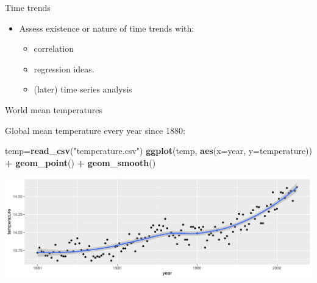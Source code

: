 \documentclass[
  ignorenonframetext,
]{beamer}
\newenvironment{Shaded}{\begin{snugshade}}{\end{snugshade}}
\newcommand{\DataTypeTok}[1]{\textcolor[rgb]{0.13,0.29,0.53}{#1}}
\newcommand{\KeywordTok}[1]{\textcolor[rgb]{0.13,0.29,0.53}{\textbf{#1}}}
\newcommand{\NormalTok}[1]{#1}
\newcommand{\OperatorTok}[1]{\textcolor[rgb]{0.81,0.36,0.00}{\textbf{#1}}}
\newcommand{\StringTok}[1]{\textcolor[rgb]{0.31,0.60,0.02}{#1}}
\providecommand{\tightlist}{%
  \setlength{\itemsep}{0pt}\setlength{\parskip}{0pt}}
\begin{document}
\begin{frame}{Time trends}
\protect\hypertarget{time-trends}{}

\begin{itemize}
\tightlist
\item
  Assess existence or nature of time trends with:

  \begin{itemize}
  \tightlist
  \item
    correlation
  \item
    regression ideas.
  \item
    (later) time series analysis
  \end{itemize}
\end{itemize}

\end{frame}

\begin{frame}[fragile]{World mean temperatures}
\protect\hypertarget{world-mean-temperatures}{}

Global mean temperature every year since 1880:

\small

\begin{Shaded}
\begin{Highlighting}[]
\NormalTok{temp=}\KeywordTok{read_csv}\NormalTok{(}\StringTok{"temperature.csv"}\NormalTok{)}
\KeywordTok{ggplot}\NormalTok{(temp, }\KeywordTok{aes}\NormalTok{(}\DataTypeTok{x=}\NormalTok{year, }\DataTypeTok{y=}\NormalTok{temperature)) }\OperatorTok{+}\StringTok{ }
\StringTok{  }\KeywordTok{geom_point}\NormalTok{() }\OperatorTok{+}\StringTok{ }\KeywordTok{geom_smooth}\NormalTok{()}
\end{Highlighting}
\end{Shaded}

\includegraphics{slides_d29_files/figure-beamer/unnamed-chunk-511-1.pdf}
\normalsize

\end{frame}
\end{document}
